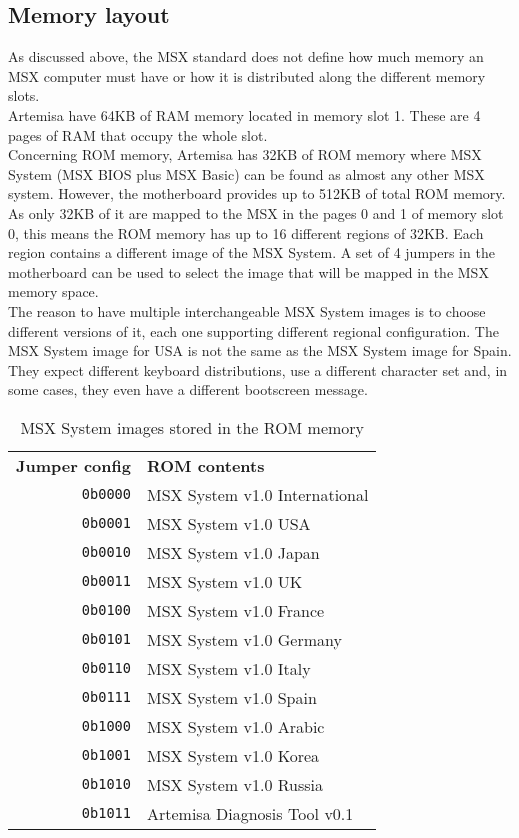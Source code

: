 \subsection{Memory layout}

As discussed above, the MSX standard does not define how much memory an MSX computer must have or how it is distributed along the different memory slots. \\

Artemisa have 64KB of RAM memory located in memory slot 1. These are 4 pages of RAM that occupy the whole slot. \\

Concerning ROM memory, Artemisa has 32KB of ROM memory where MSX System (MSX BIOS plus MSX Basic) can be found as almost any other MSX system. However, the motherboard provides up to 512KB of total ROM memory. As only 32KB of it are mapped to the MSX in the pages 0 and 1 of memory slot 0, this means the ROM memory has up to 16 different regions of 32KB. Each region contains a different image of the MSX System. A set of 4 jumpers in the motherboard can be used to select the image that will be mapped in the MSX memory space. \\

The reason to have multiple interchangeable MSX System images is to choose different versions of it, each one supporting different regional configuration. The MSX System image for USA is not the same as the MSX System image for Spain. They expect different keyboard distributions, use a different character set and, in some cases, they even have a different bootscreen message.

\begin{table}[h]
  \centering
  \begin{tabular}{r|l}
    {\bf Jumper config} & {\bf ROM contents}            \\
    {\tt 0b0000}        & MSX System v1.0 International \\
    {\tt 0b0001}        & MSX System v1.0 USA           \\
    {\tt 0b0010}        & MSX System v1.0 Japan         \\
    {\tt 0b0011}        & MSX System v1.0 UK            \\
    {\tt 0b0100}        & MSX System v1.0 France        \\
    {\tt 0b0101}        & MSX System v1.0 Germany       \\
    {\tt 0b0110}        & MSX System v1.0 Italy         \\
    {\tt 0b0111}        & MSX System v1.0 Spain         \\
    {\tt 0b1000}        & MSX System v1.0 Arabic        \\
    {\tt 0b1001}        & MSX System v1.0 Korea         \\
    {\tt 0b1010}        & MSX System v1.0 Russia        \\
    {\tt 0b1011}        & Artemisa Diagnosis Tool v0.1  \\
  \end{tabular}
  \caption{MSX System images stored in the ROM memory}
  \label{table:artemisa-rom-imgs}
\end{table}

